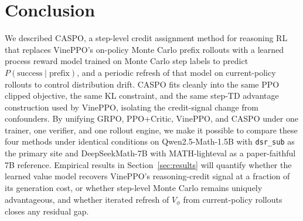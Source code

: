 \documentclass[11pt]{article}
\newcommand{\caspo}{\textsc{CASPO}}
\newcommand{\ppocritic}{PPO+Critic}
\newcommand{\grpo}{GRPO}
\newcommand{\vineppo}{VinePPO}
\begin{document}
\section{Conclusion}
\label{sec:conclusion}

We described \caspo{}, a step-level credit assignment method for
reasoning RL that replaces \vineppo{}'s on-policy Monte Carlo prefix
rollouts with a learned process reward model trained on Monte Carlo
step labels to predict $P(\text{success} \mid \text{prefix})$, and a
periodic refresh of that model on current-policy rollouts to control
distribution drift. \caspo{} fits cleanly into the same PPO clipped
objective, the same KL constraint, and the same step-TD advantage
construction used by \vineppo{}, isolating the credit-signal change
from confounders. By unifying
\grpo{}, \ppocritic{}, \vineppo{}, and \caspo{} under one trainer, one
verifier, and one rollout engine, we make it possible to compare these four
methods under identical conditions on Qwen2.5-Math-1.5B with
\texttt{dsr\_sub} as the primary site and DeepSeekMath-7B with
MATH-lighteval as a paper-faithful 7B reference. Empirical results in
Section~\ref{sec:results} will quantify whether the learned value model
recovers \vineppo{}'s reasoning-credit signal at a fraction of its
generation cost, or whether step-level Monte Carlo remains uniquely
advantageous, and whether iterated refresh of $V_\phi$ from current-policy
rollouts closes any residual gap.



\end{document}
